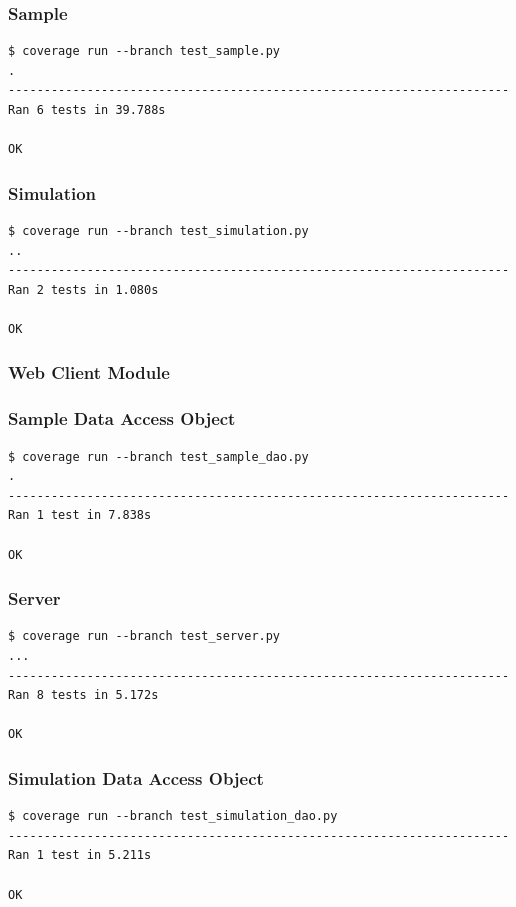 \documentclass[a4paper,11pt]{article}
\begin{document}
\begin{appendices}
\subsubsection*{Sample}
\begin{verbatim}
$ coverage run --branch test_sample.py
.
----------------------------------------------------------------------
Ran 6 tests in 39.788s

OK
\end{verbatim}

\subsubsection*{Simulation}
\begin{verbatim}
$ coverage run --branch test_simulation.py
..
----------------------------------------------------------------------
Ran 2 tests in 1.080s

OK
\end{verbatim}

\subsubsection{Web Client Module}
\subsubsection*{Sample Data Access Object}
\begin{verbatim}
$ coverage run --branch test_sample_dao.py 
.
----------------------------------------------------------------------
Ran 1 test in 7.838s

OK
\end{verbatim}

\subsubsection*{Server}
\begin{verbatim}
$ coverage run --branch test_server.py
...
----------------------------------------------------------------------
Ran 8 tests in 5.172s

OK
\end{verbatim}

\subsubsection*{Simulation Data Access Object}
\begin{verbatim}
$ coverage run --branch test_simulation_dao.py
----------------------------------------------------------------------
Ran 1 test in 5.211s

OK
\end{verbatim}

\end{appendices}
\end{document}
